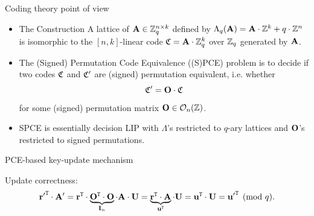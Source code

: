 \documentclass[xcolor=table,10pt,aspectratio=169]{beamer}
\begin{document}
\begin{frame}{Coding theory point of view}
  \begin{itemize}[label=\textbullet]
    \item The Construction A lattice of \(\mathbf{A} \in \mathbb{Z}_q^{n \times k}\) defined by \(\Lambda_q(\mathbf{A}) = \mathbf{A} \cdot \mathbb{Z}^k + q \cdot \mathbb{Z}^n\) is isomorphic to the \([n,k]\)-linear code \(\mathfrak{C} = \mathbf{A} \cdot \mathbb{Z}_q^k\) over \(\mathbb{Z}_q\) generated by \(\mathbf{A}\).
      \vfill
      \pause
    \item The (Signed) Permutation Code Equivalence ((S)PCE) problem is to decide if two codes \(\mathfrak{C}\) and \(\mathfrak{C}'\) are (signed) permutation equivalent, i.e. whether
      \[
        \mathfrak{C}' = \mathbf{O} \cdot \mathfrak{C}
      \]
      for some (signed) permutation matrix \(\mathbf{O} \in \mathcal{O}_n(\mathbb{Z})\).
      \vfill
      \pause
    \item SPCE is essentially decision LIP with \(\Lambda\)'s restricted to \(q\)-ary lattices and \(\mathbf{O}\)'s restricted to signed permutations.
  \end{itemize}
\end{frame}

\begin{frame}{PCE-based key-update mechanism}
  \begin{figure}
    \centering
    \begin{pchstack}[boxed]

      \pchspace

    \end{pchstack}
  \end{figure}
  \vfill
  Update correctness: 
  \[
    \mathbf{r'}^{\mathtt{T}} \cdot \mathbf{A'}
    = \mathbf{r}^{\mathtt{T}} \cdot \underbrace{\mathbf{O}^{\mathtt{T}} \cdot \mathbf{O}}_{\mathbf{I}_n} \cdot \mathbf{A} \cdot \mathbf{U}
    = \underbrace{\mathbf{r}^{\mathtt{T}} \cdot \mathbf{A}}_{\mathbf{u}^{\mathtt{T}}} \cdot \mathbf{U}
    = \mathbf{u}^{\mathtt{T}} \cdot \mathbf{U}
    = \mathbf{u'}^{\mathtt{T}} \pmod q.
  \]
\end{frame}
\end{document}
